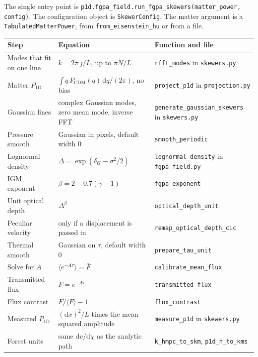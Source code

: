 \documentclass[11pt]{article}
\begin{document}
The single entry point is \texttt{p1d.fgpa\_field.run\_fgpa\_skewers(matter\_power, config)}. The configuration object is \texttt{SkewerConfig}. The matter argument is a \texttt{TabulatedMatterPower}, from \texttt{from\_eisenstein\_hu} or from a file.

\begin{center}
\small
\begin{tabular}{@{}L{0.24\textwidth}L{0.36\textwidth}L{0.32\textwidth}@{}}
\toprule
Step & Equation & Function and file \\
\midrule
Modes that fit on one line &
$k=2\pi\,j/L$, up to $\pi N/L$ &
\texttt{rfft\_modes} in \texttt{skewers.py} \\
Matter $P_{1\mathrm{D}}$ &
$\int q\,P_\mathrm{CDM}(q)\,\mathrm{d}q/(2\pi)$, no bias &
\texttt{project\_p1d} in \texttt{projection.py} \\
Gaussian lines &
complex Gaussian modes, zero mean mode, inverse FFT &
\texttt{generate\_gaussian\_skewers} in \texttt{skewers.py} \\
Pressure smooth &
Gaussian in pixels, default width $0$ &
\texttt{smooth\_periodic} \\
Lognormal density &
$\Delta=\exp(\delta_G-\sigma^{2}/2)$ &
\texttt{lognormal\_density} in \texttt{fgpa\_field.py} \\
IGM exponent &
$\beta=2-0.7(\gamma-1)$ &
\texttt{fgpa\_exponent} \\
Unit optical depth &
$\Delta^{\beta}$ &
\texttt{optical\_depth\_unit} \\
Peculiar velocity &
only if a displacement is passed in &
\texttt{remap\_optical\_depth\_cic} \\
Thermal smooth &
Gaussian on $\tau$, default width $0$ &
\texttt{prepare\_tau\_unit} \\
Solve for $A$ &
$\langle e^{-A\tau}\rangle=\bar F$ &
\texttt{calibrate\_mean\_flux} \\
Transmitted flux &
$F=e^{-A\tau}$ &
\texttt{transmitted\_flux} \\
Flux contrast &
$F/\langle F\rangle-1$ &
\texttt{flux\_contrast} \\
Measured $P_{1\mathrm{D}}$ &
$(\mathrm{d}x)^{2}/L$ times the mean squared amplitude &
\texttt{measure\_p1d} in \texttt{skewers.py} \\
Forest units &
same $\mathrm{d}v/\mathrm{d}\chi$ as the analytic path &
\texttt{k\_hmpc\_to\_skm}, \texttt{p1d\_h\_to\_kms} \\
\bottomrule
\end{tabular}
\end{center}
\end{document}

